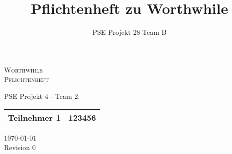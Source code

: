 \documentclass[11pt,a4paper]{scrartcl}
\author{PSE Projekt 28 Team B}
\title{Pflichtenheft zu Worthwhile}
\begin{document}
\begin{center}
  \vspace*{80pt}
  \fontsize{45}{50}\selectfont
  \textsc{Worthwhile} \\
  \textsc{Pflichtenheft}

  \vspace*{200pt}

  \LARGE
  PSE Projekt 4 - Team 2:\\
  \medskip
  \Large
  \begin{tabular}{|l|l|}
    \hline
    Teilnehmer 1 & 123456 \\
    \hline
  \end{tabular}

  \vspace*{50pt}
  \today \\
  Revision 0

\end{center}
\newpage

\tableofcontents



























\appendix


\end{document}
